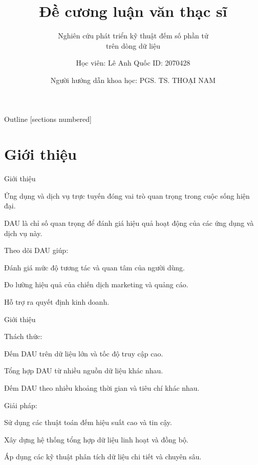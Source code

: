 \documentclass[10pt]{beamer}
\title{Đề cương luận văn thạc sĩ}
\subtitle{Nghiên cứu phát triển kỹ thuật đếm số phần tử \\ \hspace{2.4cm} trên dòng dữ liệu}
\date{Người hướng dẫn khoa học: \hspace{0.5cm}PGS. TS. THOẠI NAM}
\author{Học viên: Lê Anh Quốc \hspace{1cm} ID: 2070428}
\newcommand{\SubItem}[1]{
    {\setlength\itemindent{15pt} \item[-] #1}
}
\begin{document}
\maketitle

\begin{frame}{Outline}
  [sections numbered]
  \tableofcontents[hideallsubsections]
\end{frame}

\section{Giới thiệu}

\begin{frame}[fragile]{Giới thiệu}

\begin{itemize}
  \item Ứng dụng và dịch vụ trực tuyến đóng vai trò quan trọng trong cuộc sống hiện đại.
  \item DAU là chỉ số quan trọng để đánh giá hiệu quả hoạt động của các ứng dụng và dịch vụ này.
  \item Theo dõi DAU giúp:
  \SubItem{Đánh giá mức độ tương tác và quan tâm của người dùng.}
  \SubItem{Đo lường hiệu quả của chiến dịch marketing và quảng cáo.}
  \SubItem{Hỗ trợ ra quyết định kinh doanh.}
\end{itemize}
\end{frame}
\begin{frame}[fragile]{Giới thiệu}

\begin{itemize}
  \item Thách thức:
  \SubItem{Đếm DAU trên dữ liệu lớn và tốc độ truy cập cao.}
  \SubItem{Tổng hợp DAU từ nhiều nguồn dữ liệu khác nhau.}
  \SubItem{Đếm DAU theo nhiều khoảng thời gian và tiêu chí khác nhau.}
  \item Giải pháp:
  \SubItem{Sử dụng các thuật toán đếm hiệu suất cao và tin cậy.}
  \SubItem{Xây dựng hệ thống tổng hợp dữ liệu linh hoạt và đồng bộ.}
  \SubItem{Áp dụng các kỹ thuật phân tích dữ liệu chi tiết và chuyên sâu.}
\end{itemize}
\end{frame}
\end{document}
